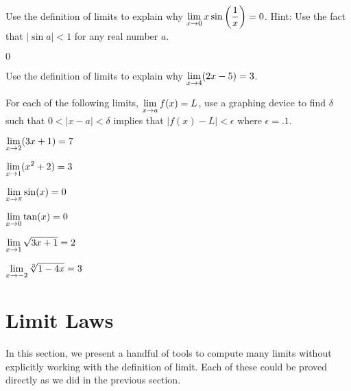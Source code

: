 \begin{exercises}


\begin{exercise} 
Use the definition of limits to explain why $\displaystyle\lim _{x\to 0 } x\sin
\left( {1\over x}\right) = 0$.  Hint: Use the fact that $|\sin a |< 1
$ for any real number $a$.
\begin{answer} $0$
\end{answer}\end{exercise}

\begin{exercise} 
Use the definition of limits to explain why $\displaystyle \lim_{x\to 4} (2x-5)
= 3$.
\end{exercise}



\begin{exercise} 
For each of the following limits, $\displaystyle \lim_{x\to a} f(x) =L$, use a
graphing device to find $\delta$ such that $0<|x -a|<\delta$ implies
that $|f(x)-L|<\epsilon$ where $\epsilon = .1$.
\begin{enumerate}
\begin{multicols}{3}
\item $\displaystyle \lim_{x\to 2}(3x+1) = 7$  
\item $\displaystyle \lim_{x\to 1} (x^2+2) = 3$  
\item $\displaystyle \lim_{x\to \pi} \sin(x) = 0$  
\item $\displaystyle \lim_{x\to 0} \tan(x) = 0$
\item $\displaystyle \lim_{x\to 1} \sqrt{3x+1} = 2$
\item $\displaystyle \lim_{x\to -2} \sqrt[3]{1-4x} = 3$
\end{multicols}  
\end{enumerate}
\end{exercise}
\end{exercises}


\section{Limit Laws}

In this section, we present a handful of tools to compute many limits
without explicitly working with the definition of limit. Each of these
could be proved directly as we did in the previous section.

